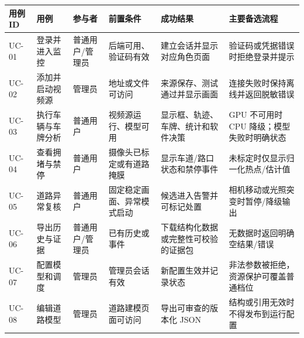 \begin{longtable}[]{@{}
  >{\raggedright\arraybackslash}p{}
  >{\raggedright\arraybackslash}p{}
  >{\raggedright\arraybackslash}p{}
  >{\raggedright\arraybackslash}p{}
  >{\raggedright\arraybackslash}p{}
  >{\raggedright\arraybackslash}p{}@{}}
\toprule\noalign{}
\begin{minipage}[b]{\linewidth}\raggedright
用例 ID
\end{minipage} & \begin{minipage}[b]{\linewidth}\raggedright
用例
\end{minipage} & \begin{minipage}[b]{\linewidth}\raggedright
参与者
\end{minipage} & \begin{minipage}[b]{\linewidth}\raggedright
前置条件
\end{minipage} & \begin{minipage}[b]{\linewidth}\raggedright
成功结果
\end{minipage} & \begin{minipage}[b]{\linewidth}\raggedright
主要备选流程
\end{minipage} \\
\midrule\noalign{}
\endhead
\bottomrule\noalign{}
\endlastfoot
UC-01 & 登录并进入监控 & 普通用户/管理员 & 后端可用、验证码有效 & 建立会话并显示对应角色页面 & 验证码或凭据错误时拒绝登录并提示 \\
UC-02 & 添加并启动视频源 & 管理员 & 地址或文件可访问 & 来源保存、测试通过并显示画面 & 连接失败时保持离线并返回脱敏错误 \\
UC-03 & 执行车辆与车牌分析 & 普通用户 & 视频源运行、模型可用 & 显示框、轨迹、车牌、统计和软件决策 & GPU 不可用时 CPU 降级；模型失败时明确状态 \\
UC-04 & 查看拥堵与禁停 & 普通用户 & 摄像头已标定或有道路掩膜 & 显示车道/路口状态和禁停事件 & 未标定时仅显示归一化热点/估计值 \\
UC-05 & 道路异常复核 & 普通用户 & 固定稳定画面、异常模式启动 & 候选进入告警并可标记处置 & 相机移动或光照突变时暂停/降级输出 \\
UC-06 & 导出历史与证据 & 普通用户/管理员 & 已有历史或事件 & 下载结构化数据或完整性可校验的证据包 & 无数据时返回明确空结果/错误 \\
UC-07 & 配置模型和调度 & 管理员 & 管理员会话有效 & 新配置生效并记录状态 & 非法参数被拒绝，资源保护可覆盖普通档位 \\
UC-08 & 编辑道路模型 & 管理员 & 道路建模页面可访问 & 导出可审查的版本化 JSON & 结构或引用无效时不得发布到运行配置 \\
\end{longtable}

